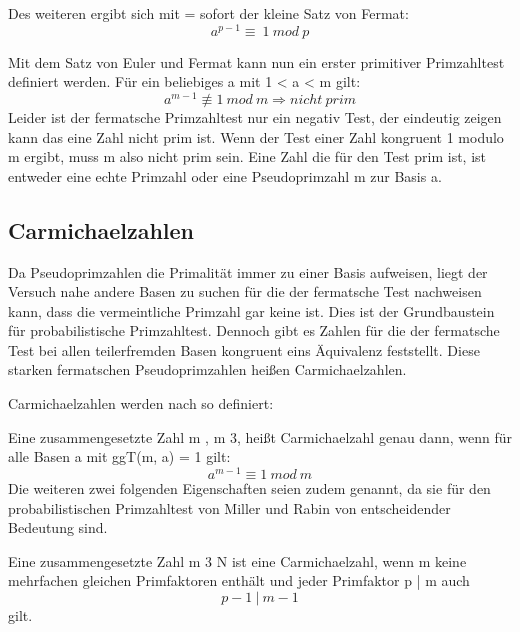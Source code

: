 	Des weiteren ergibt sich mit  =
	 sofort der kleine Satz von Fermat:
	\begin{displaymath}
		a^{p-1} \equiv~1~mod~p
	\end{displaymath}
		
	Mit dem Satz von Euler und Fermat kann nun ein erster primitiver Primzahltest definiert werden.  
	Für ein beliebiges 	a \myin {} mit 1 < a < m gilt:
	\begin{displaymath}
		a^{m-1} \not\equiv 1~mod~m \Longrightarrow nicht~prim
	\end{displaymath}
	Leider ist der fermatsche Primzahltest nur ein negativ Test, der eindeutig zeigen kann das eine Zahl nicht prim ist. Wenn der Test einer Zahl kongruent 1 modulo m ergibt, muss m also nicht prim sein. Eine Zahl die für den Test prim ist, ist entweder eine echte Primzahl oder eine Pseudoprimzahl m zur Basis a.\cite{Elementare:Zahlentheorie}
		
	\subsection{Carmichaelzahlen}
	Da Pseudoprimzahlen die Primalität immer zu einer Basis aufweisen, liegt der Versuch nahe andere Basen zu suchen für die der fermatsche Test nachweisen kann, dass die vermeintliche Primzahl gar keine ist. Dies ist der Grundbaustein für probabilistische Primzahltest. Dennoch gibt es Zahlen für die der fermatsche Test bei allen teilerfremden Basen kongruent eins Äquivalenz feststellt. Diese starken fermatschen Pseudoprimzahlen heißen Carmichaelzahlen.
	
	Carmichaelzahlen werden nach \cite{Algebraische:und:zahlentheoretische:Grundlagen:fuer:die:Informatik} so definiert:
	
	Eine zusammengesetzte Zahl m \myin {}, m \myMathRM{\geq} 3, heißt Carmichaelzahl genau dann, wenn für alle Basen a mit ggT(m, a) = 1 gilt: 
	\begin{displaymath}
		a^{m-1} \equiv 1~mod~m
	\end{displaymath}
	Die weiteren zwei folgenden Eigenschaften seien zudem genannt, da sie für den probabilistischen Primzahltest von Miller und Rabin von entscheidender Bedeutung sind.
	
	Eine zusammengesetzte Zahl m \myMathRM{\geq} 3 \myin N ist eine Carmichaelzahl, wenn m keine mehrfachen gleichen Primfaktoren enthält und jeder Primfaktor p | m auch 
	\begin{displaymath}
		p-1~|~m-1
	\end{displaymath}
	gilt.	
	
